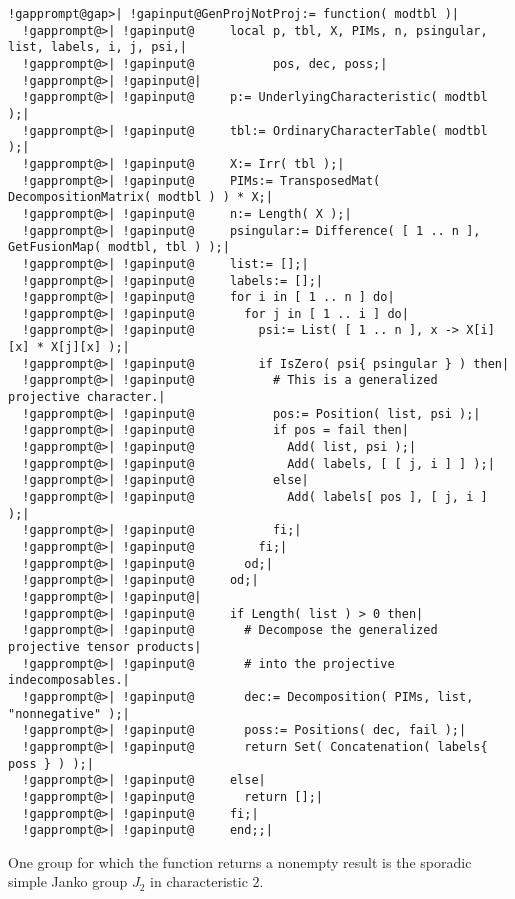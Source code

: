 \documentclass[a4paper,11pt]{report}
\begin{document}
{{{ 
\begin{Verbatim}[commandchars=!@|,fontsize=\small,frame=single,label=Example]
  !gapprompt@gap>| !gapinput@GenProjNotProj:= function( modtbl )|
  !gapprompt@>| !gapinput@     local p, tbl, X, PIMs, n, psingular, list, labels, i, j, psi,|
  !gapprompt@>| !gapinput@           pos, dec, poss;|
  !gapprompt@>| !gapinput@|
  !gapprompt@>| !gapinput@     p:= UnderlyingCharacteristic( modtbl );|
  !gapprompt@>| !gapinput@     tbl:= OrdinaryCharacterTable( modtbl );|
  !gapprompt@>| !gapinput@     X:= Irr( tbl );|
  !gapprompt@>| !gapinput@     PIMs:= TransposedMat( DecompositionMatrix( modtbl ) ) * X;|
  !gapprompt@>| !gapinput@     n:= Length( X );|
  !gapprompt@>| !gapinput@     psingular:= Difference( [ 1 .. n ], GetFusionMap( modtbl, tbl ) );|
  !gapprompt@>| !gapinput@     list:= [];|
  !gapprompt@>| !gapinput@     labels:= [];|
  !gapprompt@>| !gapinput@     for i in [ 1 .. n ] do|
  !gapprompt@>| !gapinput@       for j in [ 1 .. i ] do|
  !gapprompt@>| !gapinput@         psi:= List( [ 1 .. n ], x -> X[i][x] * X[j][x] );|
  !gapprompt@>| !gapinput@         if IsZero( psi{ psingular } ) then|
  !gapprompt@>| !gapinput@           # This is a generalized projective character.|
  !gapprompt@>| !gapinput@           pos:= Position( list, psi );|
  !gapprompt@>| !gapinput@           if pos = fail then|
  !gapprompt@>| !gapinput@             Add( list, psi );|
  !gapprompt@>| !gapinput@             Add( labels, [ [ j, i ] ] );|
  !gapprompt@>| !gapinput@           else|
  !gapprompt@>| !gapinput@             Add( labels[ pos ], [ j, i ] );|
  !gapprompt@>| !gapinput@           fi;|
  !gapprompt@>| !gapinput@         fi;|
  !gapprompt@>| !gapinput@       od;|
  !gapprompt@>| !gapinput@     od;|
  !gapprompt@>| !gapinput@|
  !gapprompt@>| !gapinput@     if Length( list ) > 0 then|
  !gapprompt@>| !gapinput@       # Decompose the generalized projective tensor products|
  !gapprompt@>| !gapinput@       # into the projective indecomposables.|
  !gapprompt@>| !gapinput@       dec:= Decomposition( PIMs, list, "nonnegative" );|
  !gapprompt@>| !gapinput@       poss:= Positions( dec, fail );|
  !gapprompt@>| !gapinput@       return Set( Concatenation( labels{ poss } ) );|
  !gapprompt@>| !gapinput@     else|
  !gapprompt@>| !gapinput@       return [];|
  !gapprompt@>| !gapinput@     fi;|
  !gapprompt@>| !gapinput@     end;;|
\end{Verbatim}
 

 One group for which the function returns a nonempty result is the sporadic
simple Janko group $J_2$ in characteristic $2$. 

}}}
\end{document}
